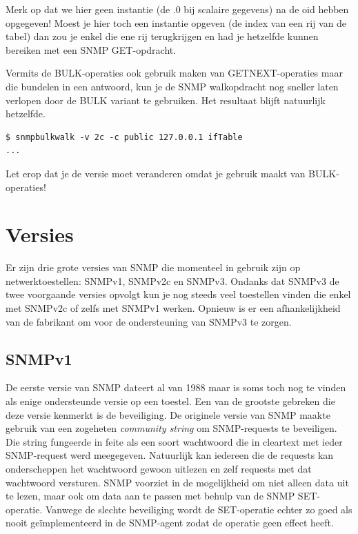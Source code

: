 Merk op dat we hier geen instantie (de .0 bij scalaire gegevens) na de \gls{oid} hebben opgegeven!
Moest je hier toch een instantie opgeven (de index van een rij van de tabel) dan zou je enkel die ene rij terugkrijgen
en had je hetzelfde kunnen bereiken met een SNMP GET-opdracht.

Vermits de BULK-operaties ook gebruik maken van GETNEXT-operaties maar die bundelen in een antwoord,
kun je de SNMP walkopdracht nog sneller laten verlopen door de BULK variant te gebruiken.
Het resultaat blijft natuurlijk hetzelfde.

\begin{lstlisting}[float=h, caption={SNMP walkopdracht m.b.v. BULK-operaties}, label=netsnmp-bulkwalk]
$ snmpbulkwalk -v 2c -c public 127.0.0.1 ifTable
...
\end{lstlisting}

Let erop dat je de versie moet veranderen omdat je gebruik maakt van BULK-operaties!


\section{Versies}
\label{snmp-versies}
Er zijn drie grote versies van SNMP die momenteel in gebruik zijn op netwerktoestellen: SNMPv1, SNMPv2c en SNMPv3.
Ondanks dat SNMPv3 de twee voorgaande versies opvolgt kun je nog steeds veel toestellen vinden die enkel met SNMPv2c of zelfs met SNMPv1 werken.
Opnieuw is er een afhankelijkheid van de fabrikant om voor de ondersteuning van SNMPv3 te zorgen.


\subsection{SNMPv1}
De eerste versie van SNMP dateert al van 1988 maar is soms toch nog te vinden als enige ondersteunde versie op een toestel.
Een van de grootste gebreken die deze versie kenmerkt is de beveiliging.
De originele versie van SNMP maakte gebruik van een zogeheten \emph{community string} om SNMP-requests te beveiligen.
Die string fungeerde in feite als een soort wachtwoord die in cleartext met ieder SNMP-request werd meegegeven\cite{snmp-wiki}.
Natuurlijk kan iedereen die de requests kan onderscheppen het wachtwoord gewoon uitlezen en zelf requests met dat wachtwoord versturen.
SNMP voorziet in de mogelijkheid om niet alleen data uit te lezen, maar ook om data aan te passen met behulp van de SNMP SET-operatie.
Vanwege de slechte beveiliging wordt de SET-operatie echter zo goed als nooit geïmplementeerd in de SNMP-agent zodat de operatie geen effect heeft.

